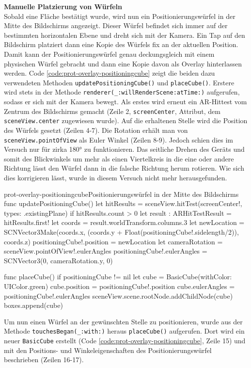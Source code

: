 \begin{description}
	\textbf{Manuelle Platzierung von Würfeln}\\
	Sobald eine Fläche bestätigt wurde, wird nun ein Positionierungswürfel in der Mitte des Bildschirms angezeigt. Dieser Würfel befindet sich immer auf der bestimmten horizontalen Ebene und dreht sich mit der Kamera. Ein Tap auf den Bildschirm platziert dann eine Kopie des Würfels fix an der aktuellen Position. Damit kann der Positionierungswürfel genau deckungsgleich mit einem physischen Würfel gebracht und dann eine Kopie davon als Overlay hinterlassen werden. Code \ref{code:prot-overlay-positioningcube} zeigt die beiden dazu verwendeten Methoden \texttt{updatePositioningCube()} und \texttt{placeCube()}. Erstere wird stets in der Methode \texttt{renderer(\_:willRenderScene:atTime:)} aufgerufen, sodass er sich mit der Kamera bewegt. Als erstes wird erneut ein AR-Hittest vom Zentrum des Bildschirms gemacht (Zeile 2, \texttt{screenCenter}, Attribut, dem \texttt{sceneView.center} zugewiesen wurde). Auf die erhaltenen Stelle wird die Position des Würfels gesetzt (Zeilen 4-7). Die Rotation erhält man von \texttt{sceneView.pointOfView} als Euler Winkel (Zeilen 8-9). Jedoch schien dies im Versuch nur für zirka 180° zu funktionieren. Das seitliche Drehen des Geräts und somit des Blickwinkels um mehr als einen Viertelkreis in die eine oder andere Richtung lässt den Würfel dann in die falsche Richtung herum rotieren. Wie sich dies korrigieren lässt, wurde in diesem Versuch nicht mehr herausgefunden.

	\begin{code}{prot-overlay-positioningcube}{Positionierungswürfel in der Mitte des Bildschirms}
		func updatePositioningCube() {
			let hitResults = sceneView.hitTest(screenCenter!, types: .existingPlane)
			if hitResults.count > 0 {
				let result : ARHitTestResult = hitResults.first!
				let coords = result.worldTransform.columns.3
				let newLocation = SCNVector3Make(coords.x, (coords.y + Float(positioningCube!.sidelength/2)), coords.z)
				positioningCube!.position = newLocation
				let cameraRotation = sceneView.pointOfView!.eulerAngles
				positioningCube!.eulerAngles = SCNVector3(0, cameraRotation.y, 0)
			}
		}
		
		func placeCube() {
			if positioningCube != nil {
				let cube = BasicCube(withColor: UIColor.green)
				cube.position = positioningCube!.position
				cube.eulerAngles = positioningCube!.eulerAngles
				sceneView.scene.rootNode.addChildNode(cube)
				boxes.append(cube)
			}
		}
	\end{code}

	Um nun einen Würfel an der gewünschten Stelle zu positionieren, wurde aus der Methode \texttt{touchesBegan(\_:with:)} heraus \texttt{placeCube()} aufgerufen. Dort wird ein neuer \texttt{BasicCube} erstellt (Code \ref{code:prot-overlay-positioningcube}, Zeile 15) und mit den Positions- und Winkeleigenschaften des Positionierungswürfel beschrieben (Zeilen 16-17).

\end{description}
